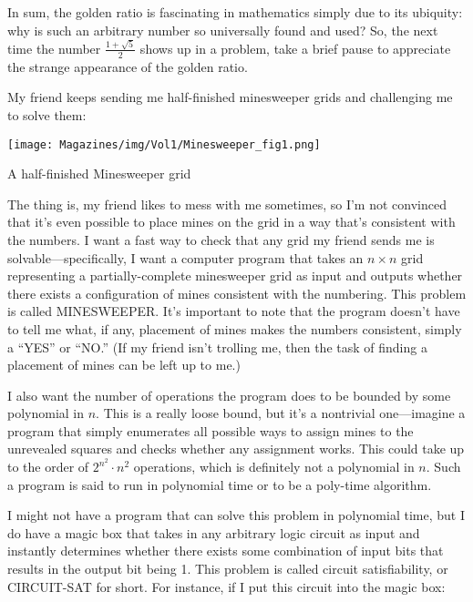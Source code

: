 \documentclass{article}
\begin{document}
\begin{multicols}{3}
{In sum, the golden ratio is fascinating in mathematics simply due to its ubiquity: why is such an arbitrary number so universally found and used? So, the next time the number $\frac{1+\sqrt5}2$ shows up in a problem, take a brief pause to appreciate the strange appearance of the golden ratio.
\closearticle



My friend keeps sending me half-finished minesweeper grids and challenging me to solve them:
\begin{center}
    \texttt{[image: Magazines/img/Vol1/Minesweeper\_fig1.png]}
    
    \small{A half-finished Minesweeper grid}
\end{center}

The thing is, my friend likes to mess with me sometimes, so I’m not convinced that it’s even possible to place mines on the grid in a way that’s consistent with the numbers. I want a fast way to check that any grid my friend sends me is solvable---specifically, I want a computer program that takes an $n \times n$ grid representing a partially-complete minesweeper grid as input and outputs whether there exists a configuration of mines consistent with the numbering. This problem is called MINESWEEPER. It’s important to note that the program doesn’t have to tell me what, if any, placement of mines makes the numbers consistent, simply a  “YES” or “NO.” (If my friend isn’t trolling me, then the task of finding a placement of mines can be left up to me.)

I also want the number of operations the program does to be bounded by some polynomial in $n$. This is a really loose bound, but it’s a nontrivial one---imagine a program that simply enumerates all possible ways to assign mines to the unrevealed squares and checks whether any assignment works. This could take up to the order of $2^{n^2} \cdot n^2$ operations, which is definitely not a polynomial in $n$. Such a program is said to run in polynomial time or to be a poly-time algorithm.


I might not have a program that can solve this problem in polynomial time, but I do have a magic box that takes in any arbitrary logic circuit as input and instantly determines whether there exists some combination of input bits that results in the output bit being 1. This problem is called circuit satisfiability, or CIRCUIT-SAT for short. For instance, if I put this circuit into the magic box:

}
\end{multicols}
\end{document}
